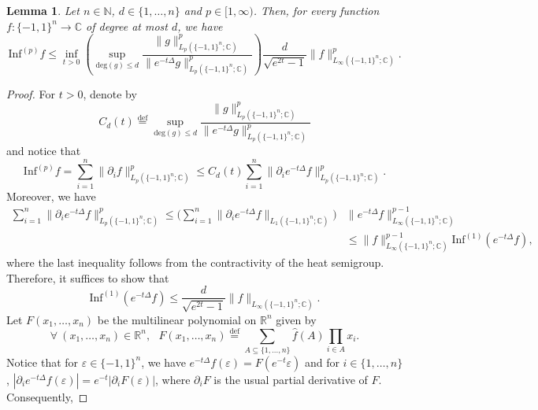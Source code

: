 \documentclass[11pt,reqno]{amsart}
\renewcommand{\leq}{\leqslant}
\newcommand{\e}{\varepsilon}
\newcommand{\R}{\mathbb R}
\newcommand{\1}{\mathbf 1}
\newtheorem{lemma}[theorem]{Lemma}
\theoremstyle{remark}
\newcommand{\C}{\mathbb C}
\newcommand{\N}{\mathbb N}
\newcommand{\eqdef}{\stackrel{\mathrm{def}}{=}}
\begin{document}
\begin{lemma} \label{lem:usesarantopoulos}
Let $n\in\N$, $d\in\{1,\ldots,n\}$ and $p\in[1,\infty)$. Then, for every function $f:\{-1,1\}^n\to\C$ of degree at most $d$, we have
\begin{equation}
\mathrm{Inf}^{(p)} f \leq \inf_{t>0} \left( \sup_{\mathrm{deg}(g)\leq d} \frac{\|g\|_{L_p(\{-1,1\}^n;\C)}^p}{\|e^{-t\Delta}g\|_{L_p(\{-1,1\}^n;\C)}^p} \right) \frac{d}{\sqrt{e^{2t}-1}} \|f\|_{L_\infty(\{-1,1\}^n;\C)}^p.
\end{equation}
\end{lemma}

\begin{proof}
For $t>0$, denote by
\begin{equation}
C_d(t) \eqdef \sup_{\mathrm{deg}(g)\leq d}  \frac{\|g\|_{L_p(\{-1,1\}^n;\C)}^p}{\|e^{-t\Delta}g\|_{L_p(\{-1,1\}^n;\C)}^p}
\end{equation}
and notice that
\begin{equation} \label{eq:useCd}
\mathrm{Inf}^{(p)} f  = \sum_{i=1}^n \|\partial_if\|^p_{L_p(\{-1,1\}^n;\C)} \leq C_d(t) \sum_{i=1}^n \|\partial_ie^{-t\Delta}f\|^p_{L_p(\{-1,1\}^n;\C)}.
\end{equation}
Moreover, we have
\begin{equation} \label{eq:boundCd}
\begin{split}
 \sum_{i=1}^n \|\partial_ie^{-t\Delta}f\|^p_{L_p(\{-1,1\}^n;\C)} \leq \Big(\sum_{i=1}^n \|\partial_ie^{-t\Delta}f\|_{L_1(\{-1,1\}^n;\C)}\Big) & \|e^{-t\Delta}f\|_{L_\infty(\{-1,1\}^n;\C)}^{p-1} 
\\ &\leq \|f\|_{L_\infty(\{-1,1\}^n;\C)}^{p-1} \mathrm{Inf}^{(1)}(e^{-t\Delta}f),
\end{split}
\end{equation}
where the last inequality follows from the contractivity of the heat semigroup. Therefore, it suffices to show that
\begin{equation} \label{eq:saranto2}
\mathrm{Inf}^{(1)} (e^{-t\Delta}f) \leq \frac{d}{\sqrt{e^{2t}-1}} \|f\|_{L_\infty(\{-1,1\}^n;\C)}.
\end{equation}
Let $F(x_1,\ldots,x_n)$ be the multilinear polynomial on $\R^n$ given by
\begin{equation}
\forall \ (x_1,\ldots,x_n)\in\R^n, \ \ \ F(x_1,\ldots,x_n) \eqdef \sum_{A\subseteq\{1,\ldots,n\}} \widehat{f}(A) \prod_{i\in A} x_i.
\end{equation}
Notice that for $\e\in\{-1,1\}^n$, we have $e^{-t\Delta}f(\e) = F(e^{-t}\e)$ and for $i\in\{1,\ldots,n\}$, $|\partial_i e^{-t\Delta} f(\e)| = e^{-t} |\partial_i F(\e)|$, where $\partial_i F$ is the usual partial derivative of $F$. Consequently,

\end{proof}
\end{document}
